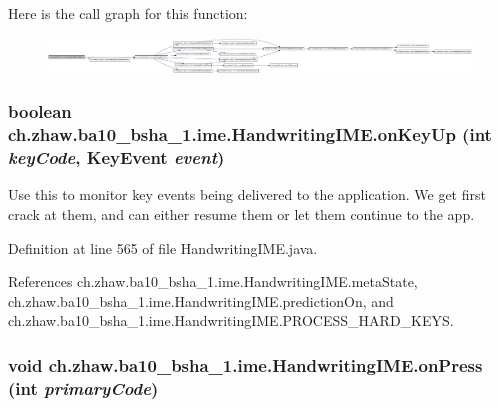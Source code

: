 Here is the call graph for this function:\nopagebreak
\begin{figure}[H]
\begin{center}
\leavevmode
\includegraphics[width=420pt]{classch_1_1zhaw_1_1ba10__bsha__1_1_1ime_1_1HandwritingIME_a999c8827bbffc0388be05c9e87e2ac49_cgraph}
\end{center}
\end{figure}
\hypertarget{classch_1_1zhaw_1_1ba10__bsha__1_1_1ime_1_1HandwritingIME_a3d39e17d6aa63cc1b2564dcb2022c8ec}{
\subsubsection[{onKeyUp}]{\setlength{\rightskip}{0pt plus 5cm}boolean ch.zhaw.ba10\_\-bsha\_\-1.ime.HandwritingIME.onKeyUp (int {\em keyCode}, \/  KeyEvent {\em event})}}
\label{classch_1_1zhaw_1_1ba10__bsha__1_1_1ime_1_1HandwritingIME_a3d39e17d6aa63cc1b2564dcb2022c8ec}
Use this to monitor key events being delivered to the application. We get first crack at them, and can either resume them or let them continue to the app. 

Definition at line 565 of file HandwritingIME.java.

References ch.zhaw.ba10\_\-bsha\_\-1.ime.HandwritingIME.metaState, ch.zhaw.ba10\_\-bsha\_\-1.ime.HandwritingIME.predictionOn, and ch.zhaw.ba10\_\-bsha\_\-1.ime.HandwritingIME.PROCESS\_\-HARD\_\-KEYS.\hypertarget{classch_1_1zhaw_1_1ba10__bsha__1_1_1ime_1_1HandwritingIME_abb77d1d11f616d5980ea16858a6b6190}{
\subsubsection[{onPress}]{\setlength{\rightskip}{0pt plus 5cm}void ch.zhaw.ba10\_\-bsha\_\-1.ime.HandwritingIME.onPress (int {\em primaryCode})}}
\label{classch_1_1zhaw_1_1ba10__bsha__1_1_1ime_1_1HandwritingIME_abb77d1d11f616d5980ea16858a6b6190}


